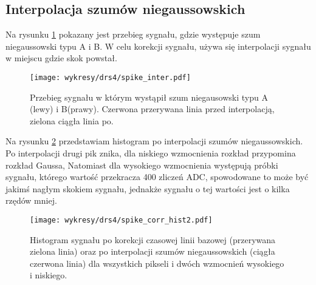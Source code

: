 \documentclass[a4paper,11pt,twoside]{article}
\begin{document}
\subsection{Interpolacja szumów niegaussowskich}
Na rysunku \ref{fig:spike_corr} pokazany jest przebieg sygnału, gdzie występuje szum niegaussowski typu A i B. W celu korekcji sygnału, używa się interpolacji sygnału w miejscu gdzie skok powstał.
\begin{figure}[H] 
\centering
\texttt{[image: wykresy/drs4/spike\_inter.pdf]}
\caption{Przebieg sygnału w którym wystąpił szum niegausowski typu A (lewy) i B(prawy). Czerwona przerywana linia przed interpolacją, zielona ciągła linia po.}
\label{fig:spike_corr}
\end{figure}
Na rysunku \ref{fig:spike_hist} przedstawiam histogram po interpolacji szumów niegaussowskich. Po interpolacji drugi pik znika, dla niskiego wzmocnienia rozkład przypomina rozkład Gaussa, Natomiast dla wysokiego wzmocnienia występują próbki sygnału, którego wartość przekracza 400 zliczeń ADC, spowodowane to może być jakimś nagłym skokiem sygnału, jednakże sygnału o tej wartości jest o kilka rzędów mniej. 
\begin{figure}[H] 
\centering
\texttt{[image: wykresy/drs4/spike\_corr\_hist2.pdf]}
\caption{Histogram sygnału po korekcji czasowej linii bazowej (przerywana zielona linia) oraz po interpolacji szumów niegaussowskich (ciągła czerwona linia) dla wszystkich pikseli i dwóch wzmocnień wysokiego i niskiego.}
\label{fig:spike_hist}
\end{figure}
\end{document}
